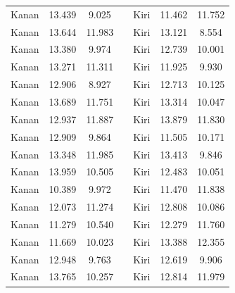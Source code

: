 \begin{longtable}{|c|c|c|c|c|c|c|}
  Kanan          & 13.439              & 9.025            &  & Kiri           & 11.462              & 11.752           \\ \cline{1-3} \cline{5-7} 
  Kanan          & 13.644              & 11.983           &  & Kiri           & 13.121              & 8.554            \\ \cline{1-3} \cline{5-7} 
  Kanan          & 13.380              & 9.974            &  & Kiri           & 12.739              & 10.001           \\ \cline{1-3} \cline{5-7} 
  Kanan          & 13.271              & 11.311           &  & Kiri           & 11.925              & 9.930            \\ \cline{1-3} \cline{5-7} 
  Kanan          & 12.906              & 8.927            &  & Kiri           & 12.713              & 10.125           \\ \cline{1-3} \cline{5-7} 
  Kanan          & 13.689              & 11.751           &  & Kiri           & 13.314              & 10.047           \\ \cline{1-3} \cline{5-7} 
  Kanan          & 12.937              & 11.887           &  & Kiri           & 13.879              & 11.830           \\ \cline{1-3} \cline{5-7} 
  Kanan          & 12.909              & 9.864            &  & Kiri           & 11.505              & 10.171           \\ \cline{1-3} \cline{5-7} 
  Kanan          & 13.348              & 11.985           &  & Kiri           & 13.413              & 9.846            \\ \cline{1-3} \cline{5-7} 
  Kanan          & 13.959              & 10.505           &  & Kiri           & 12.483              & 10.051           \\ \cline{1-3} \cline{5-7} 
  Kanan          & 10.389              & 9.972            &  & Kiri           & 11.470              & 11.838           \\ \cline{1-3} \cline{5-7} 
  Kanan          & 12.073              & 11.274           &  & Kiri           & 12.808              & 10.086           \\ \cline{1-3} \cline{5-7} 
  Kanan          & 11.279              & 10.540           &  & Kiri           & 12.279              & 11.760           \\ \cline{1-3} \cline{5-7} 
  Kanan          & 11.669              & 10.023           &  & Kiri           & 13.388              & 12.355           \\ \cline{1-3} \cline{5-7} 
  Kanan          & 12.948              & 9.763            &  & Kiri           & 12.619              & 9.906            \\ \cline{1-3} \cline{5-7} 
  Kanan          & 13.765              & 10.257           &  & Kiri           & 12.814              & 11.979           \\ \cline{1-3} \cline{5-7} 
\end{longtable}

